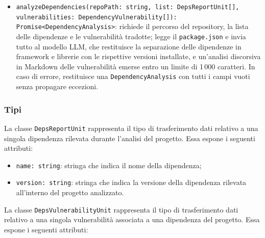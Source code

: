 \documentclass[a4paper, 11pt]{article}
\newcounter{subsubsubsection}[subsubsection]
\begin{document}
\begin{itemize}
  \item \texttt{analyzeDependencies(repoPath: string, list: DepsReportUnit[],}
  \texttt{vulnerabilities: DependencyVulnerability[]): Promise<DependencyAnalysis>}:
  richiede il percorso del repository, la lista delle dipendenze e le vulnerabilità
  tradotte; legge il \texttt{package.json} e invia tutto al modello LLM, che restituisce
  la separazione delle dipendenze in framework e librerie con le rispettive versioni
  installate, e un'analisi discorsiva in Markdown delle vulnerabilità emerse entro
  un limite di 1\,000 caratteri. In caso di errore, restituisce una
  \texttt{DependencyAnalysis} con tutti i campi vuoti senza propagare eccezioni.
\end{itemize}

 
 \newpage
  \subsubsection{Tipi}
 
\label{sec:DepsReportUnit}
 
La classe \texttt{DepsReportUnit} rappresenta il tipo di trasferimento dati relativo a una singola
dipendenza rilevata durante l'analisi del progetto. Essa espone i seguenti attributi:
 
\begin{itemize}
  \item \texttt{name: string}: stringa che indica il nome della dipendenza;
 
  \item \texttt{version: string}: stringa che indica la versione della dipendenza rilevata
    all'interno del progetto analizzato.
\end{itemize}
 
\label{sec:DepsVulnerabilityUnit}
 
La classe \texttt{DepsVulnerabilityUnit} rappresenta il tipo di trasferimento dati relativo a una
singola vulnerabilità associata a una dipendenza del progetto. Essa espone i seguenti attributi:
 
\end{document}
